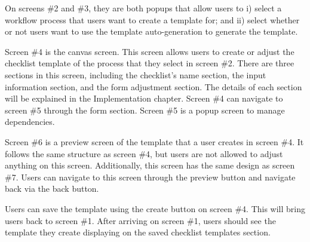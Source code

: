On screens \#2 and \#3, they are both popups that allow users to i) select a workflow process that users want to create a template for; and ii) select whether or not users want to use the template auto-generation to generate the template.

Screen \#4 is the canvas screen. This screen allows users to create or adjust the checklist template of the process that they select in screen \#2. There are three sections in this screen, including the checklist's name section, the input information section, and the form adjustment section. The details of each section will be explained in the Implementation chapter.
Screen \#4 can navigate to screen \#5 through the form section. Screen \#5 is a popup screen to manage dependencies.



Screen \#6 is a preview screen of the template that a user creates in screen \#4. It follows the same structure as screen \#4, but users are not allowed to adjust anything on this screen. Additionally, this screen has the same design as screen \#7. Users can navigate to this screen through the preview button and navigate back via the back button.

Users can save the template using the create button on screen \#4. This will bring users back to screen \#1. After arriving on screen \#1, users should see the template they create displaying on the saved checklist templates section.



